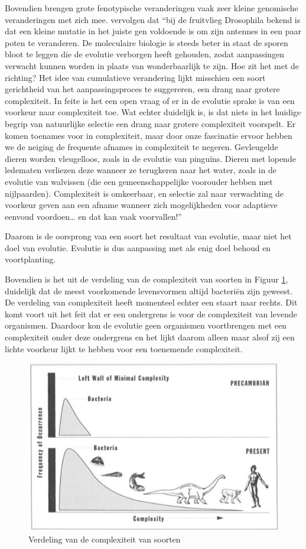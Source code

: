 \documentclass[
  11pt,
]{book}
\begin{document}
Bovendien brengen grote fenotypische veranderingen vaak zeer kleine genomische veranderingen met zich mee. \citet{rosenberg2008} vervolgen dat ``bij de fruitvlieg Drosophila bekend is dat een kleine mutatie in het juiste gen voldoende is om zijn antennes in een paar poten te veranderen. De moleculaire biologie is steeds beter in staat de sporen bloot te leggen die de evolutie verborgen heeft gehouden, zodat aanpassingen verwacht kunnen worden in plaats van wonderbaarlijk te zijn. Hoe zit het met de richting? Het idee van cumulatieve verandering lijkt misschien een soort gerichtheid van het aanpassingsproces te suggereren, een drang naar grotere complexiteit. In feite is het een open vraag of er in de evolutie sprake is van een voorkeur naar complexiteit toe. Wat echter duidelijk is, is dat niets in het huidige begrip van natuurlijke selectie een drang naar grotere complexiteit voorspelt. Er komen toenames voor in complexiteit, maar door onze fascinatie ervoor hebben we de neiging de frequente afnames in complexiteit te negeren. Gevleugelde dieren worden vleugelloos, zoals in de evolutie van pinguïns. Dieren met lopende ledematen verliezen deze wanneer ze terugkeren naar het water, zoals in de evolutie van walvissen (die een gemeenschappelijke voorouder hebben met nijlpaarden). Complexiteit is omkeerbaar, en selectie zal naar verwachting de voorkeur geven aan een afname wanneer zich mogelijkheden voor adaptieve eenvoud voordoen\ldots{} en dat kan vaak voorvallen!''

Daarom is de oorsprong van een soort het resultaat van evolutie, maar niet het doel van evolutie. Evolutie is dus aanpassing met als enig doel behoud en voortplanting.

Bovendien is het uit de verdeling van de complexiteit van soorten in Figuur \ref{fig:distributionComplexity}, duidelijk dat de meest voorkomende levensvormen altijd bacteriën zijn geweest. De verdeling van complexiteit heeft momenteel echter een staart naar rechts. Dit komt voort uit het feit dat er een ondergrens is voor de complexiteit van levende organismen. Daardoor kon de evolutie geen organismen voortbrengen met een complexiteit onder deze ondergrens en het lijkt daarom alleen maar alsof zij een lichte voorkeur lijkt te hebben voor een toenemende complexiteit.



\begin{figure}

{\centering \includegraphics[width=0.45\linewidth]{./figs/selectionNoDirectionDef} 

}

\caption{Verdeling van de complexiteit van soorten \citep{gould1997}}\label{fig:distributionComplexity}
\end{figure}
\end{document}
